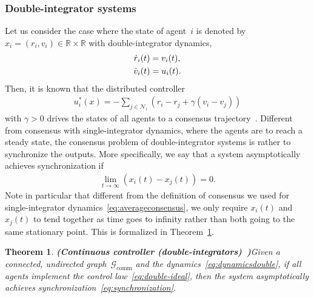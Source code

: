 \documentclass{autart}
\newtheorem{theorem}{Theorem}[section]
\newcommand{\real}{{\mathbb{R}}}
\newcommand{\GG}{{\mathcal{G}}}
\newcommand{\NN}{{\mathcal{N}}}
\newcommand{\commgraph}{\GG_\text{comm}}
\newcommand{\longthmtitle}[1]{\mbox{}\textup{\textbf{(#1)}}}
\begin{document}
\subsubsection{Double-integrator systems} \label{sec:DI}
%

Let us consider the case where the state of agent~$i$ is denoted
by~$x_i = (r_i,v_i) \in \real \times \real$ with double-integrator
dynamics,
\begin{align}\label{eq:dynamicsdouble}
  \dot{r}_i(t) &= v_i(t) , \\
  \dot{v}_i(t) &= u_i(t) . \notag
\end{align}
Then, it is known that the distributed controller
\begin{align}\label{eq:double-ideal}
  u_i^*(x) = - \sum_{j \in \NN_i} (r_i - r_j + \gamma(v_i - v_j) )
\end{align}
with $\gamma > 0$ drives the states of all agents to a consensus
trajectory~\citep{WR-EA:07,WR:08b}.  Different from consensus with
single-integrator dynamics, where the agents are to reach a steady
state, the consensus problem of double-integrator systems is rather to
synchronize the outputs.  More specifically, we say that a system
asymptotically achieves synchronization if
\begin{align}\label{eq:synchronization}
  \lim_{t \rightarrow \infty} (x_i(t) - x_j(t)) = 0. 
\end{align}
Note in particular that different from the definition of consensus we
used for single-integrator dynamics~\eqref{eq:averageconsensus}, we
only require $x_i(t)$ and $x_j(t)$ to tend together as time goes to
infinity rather than both going to the same stationary point.
This is formalized in Theorem~\ref{th:DI}.

\begin{theorem}\longthmtitle{Continuous controller
    (double-integrators)~\citep{WR:08b}}\label{th:DI}
  Given {a connected, undirected graph~$\commgraph$ and} the
  dynamics~\eqref{eq:dynamicsdouble}, if all agents implement the
  control law~\eqref{eq:double-ideal}, then the system asymptotically
  achieves synchronization~\eqref{eq:synchronization}.
\end{theorem}
\end{document}
